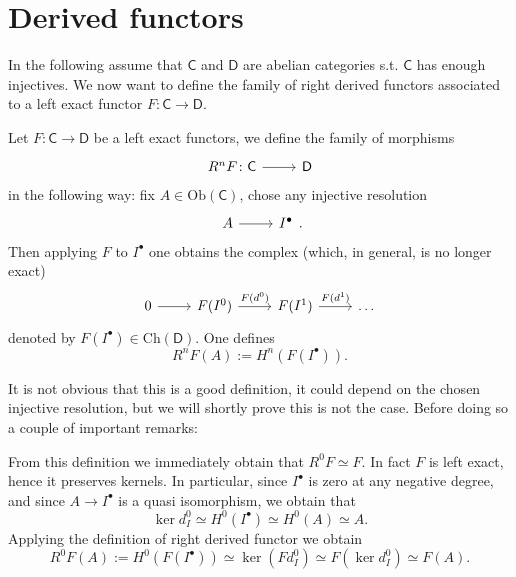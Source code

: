 \documentclass[../Main]{subfiles}
\begin{document}
\section{Derived functors}
In the following assume that $\mathsf{C}$ and $\mathsf{D}$ are abelian categories
s.t. $\mathsf{C}$ has enough injectives.
We now want to define the family of right derived functors associated to a left exact
functor $F\colon \mathsf{C} \to \mathsf{D}$.

\begin{defn}
	Let $F\colon \mathsf{C} \to \mathsf{D}$ be a left exact functors,
	we define the family of morphisms 
	\begin{equation}
	\begin{tikzcd}
		R^nF\colon \mathsf{C} \arrow[r, "", rightarrow] &
		\mathsf{D}
	\end{tikzcd}
	\end{equation} 
	in the following way:
	fix $A \in \mathrm{Ob} \left(\mathsf{C}\right)$, chose any injective resolution
	\begin{equation}
	\begin{tikzcd}
		A \arrow[r, "", rightarrow] &
		I^\bullet
	\end{tikzcd}
	.\end{equation} 
	Then applying $F$ to $I^\bullet$ one obtains the complex
	(which, in general, is no longer exact)
	\begin{equation}
	\begin{tikzcd}
		0 \arrow[r, "", rightarrow] &
		F(I^0) \arrow[r, "F(d^0)", rightarrow] &
		F(I^1) \arrow[r, "F(d^1)", rightarrow] &
		\ldots
	\end{tikzcd}
	\end{equation} 
	denoted by $F(I^\bullet) \in \mathrm{Ch}(\mathsf{D})$.
	One defines 
	\begin{equation}
		R^n F(A) := H^{n} \left( F(I^\bullet) \right)
	.\end{equation} 
\end{defn}
It is not obvious that this is a good definition, it could depend on the chosen injective resolution,
but we will shortly prove this is not the case.
Before doing so a couple of important remarks:

\begin{rem}[]
	From this definition we immediately obtain that $R^0 F \simeq F$.
	In fact $F$ is left exact, hence it preserves kernels.
	In particular, since $I^\bullet$ is zero at any negative degree,
	and since $A \to  I^\bullet$ is a quasi isomorphism, we obtain that
	\begin{equation}
	\ker d^0_I \simeq
	H^{0} \left( I^\bullet \right) \simeq 
	H^{0} \left( A \right) \simeq A
	.\end{equation} 
	Applying the definition of right derived functor we obtain
	\begin{equation}
		R^{0}F \left( A \right) := 
		H^{0} \left( F (I^\bullet) \right) \simeq 
		\ker (F d^0_I) \simeq 
		F (\ker d^0_I) \simeq F(A)
	.\end{equation} 
\end{rem}
\end{document}
